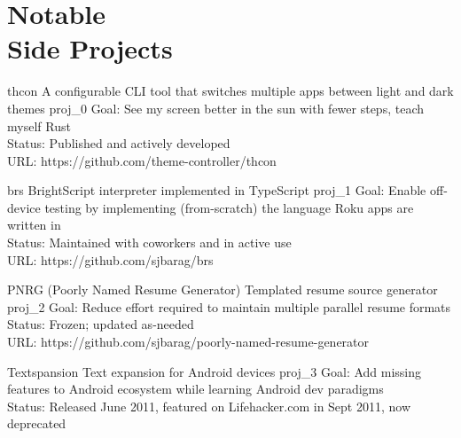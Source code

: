 \documentclass[10pt]{barag_resume}
\begin{document}
    \newpage %
\section{Notable\\ Side Projects}\relax
    \begin{project}
        {thcon}
        {A configurable CLI tool that switches multiple apps between light and dark themes}
        {proj_0}
            Goal: See my screen better in the sun with fewer steps, teach myself Rust\\
            Status: Published and actively developed \\ 
            URL: https://github.com/theme-controller/thcon
    \end{project}

    \begin{project}
        {brs}
        {BrightScript interpreter implemented in TypeScript}
        {proj_1}
            Goal: Enable off-device testing by implementing (from-scratch) the language Roku apps are written in\\
            Status: Maintained with coworkers and in active use \\ 
            URL: https://github.com/sjbarag/brs
    \end{project}

    \begin{project}
        {PNRG (Poorly Named Resume Generator)}
        {Templated resume source generator}
        {proj_2}
            Goal: Reduce effort required to maintain multiple parallel resume formats\\
            Status: Frozen; updated as-needed \\ 
            URL: https://github.com/sjbarag/poorly-named-resume-generator
    \end{project}

    \begin{project}
        {Textspansion}
        {Text expansion for Android devices}
        {proj_3}
            Goal: Add missing features to Android ecosystem while learning Android dev paradigms\\
            Status: Released June 2011, featured on Lifehacker.com in Sept 2011, now deprecated    \end{project}
\end{document}
